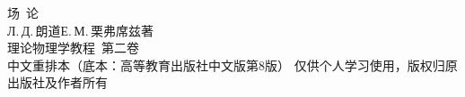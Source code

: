 \documentclass[11pt,a4paper,twoside,openright]{ctexbook}
\numberwithin{equation}{section}
\begin{document}
\begin{titlepage}
\thispagestyle{empty}
\centering
\vspace*{3.2cm}
{\heiti 场\ 论}\\[1.2em]
{\kaishu Л.\,Д.\,朗道\quad Е.\,М.\,栗弗席兹\quad 著}\\[3em]
{\kaishu 理论物理学教程\ 第二卷}\\[2em]
{\kaishu 中文重排本（底本：高等教育出版社中文版第8版）}
\vfill
{\kaishu 仅供个人学习使用，版权归原出版社及作者所有}
\end{titlepage}

{\hypersetup{linktoc=all}\tableofcontents}
\clearpage
















\end{document}
